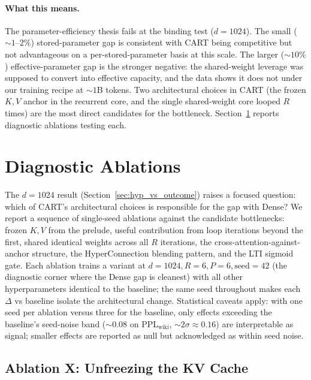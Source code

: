 \documentclass{article}
\newcommand{\cart}{\textsc{CART}}
\newcommand{\pplwiki}{PPL$_\text{wiki}$}
\begin{document}
\paragraph{What this means.}
The parameter-efficiency thesis fails at the binding test ($d{=}1024$). The small ($\sim 1$--$2\%$) stored-parameter gap is consistent with \cart{} being competitive but not advantageous on a per-stored-parameter basis at this scale. The larger ($\sim 10\%$) effective-parameter gap is the stronger negative: the shared-weight leverage was supposed to convert into effective capacity, and the data shows it does not under our training recipe at $\sim 1$B tokens. Two architectural choices in \cart{} (the frozen $K, V$ anchor in the recurrent core, and the single shared-weight core looped $R$ times) are the most direct candidates for the bottleneck. Section~\ref{sec:ablations} reports diagnostic ablations testing each.

\section{Diagnostic Ablations}
\label{sec:ablations}

The $d{=}1024$ result (Section~\ref{sec:hyp_vs_outcome}) raises a focused question: which of \cart{}'s architectural choices is responsible for the gap with Dense? We report a sequence of single-seed ablations against the candidate bottlenecks: frozen $K, V$ from the prelude, useful contribution from loop iterations beyond the first, shared identical weights across all $R$ iterations, the cross-attention-against-anchor structure, the HyperConnection blending pattern, and the LTI sigmoid gate. Each ablation trains a variant at $d{=}1024, R{=}6, P{=}6, \text{seed}{=}42$ (the diagnostic corner where the Dense gap is cleanest) with all other hyperparameters identical to the baseline; the same seed throughout makes each $\Delta$ vs baseline isolate the architectural change. Statistical caveats apply: with one seed per ablation versus three for the baseline, only effects exceeding the baseline's seed-noise band ($\sim 0.08$ on \pplwiki, $\sim 2\sigma \approx 0.16$) are interpretable as signal; smaller effects are reported as null but acknowledged as within seed noise.

\subsection{Ablation X: Unfreezing the KV Cache}
\label{sec:abl_kv}
\end{document}
